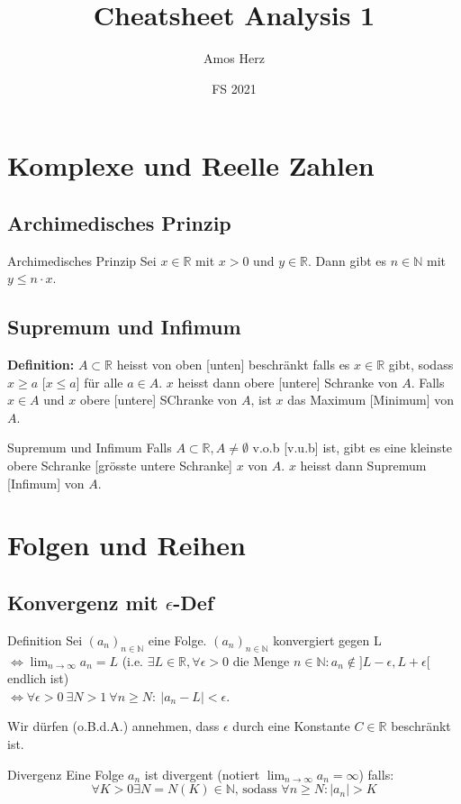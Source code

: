\documentclass[a4paper,8pt]{extarticle}
\title{\vspace{-1cm}Cheatsheet Analysis 1\vspace{-0.65cm}}
\author{Amos Herz\vspace{-0.5cm}}
\date{FS 2021}
\newenvironment{definition}{
   \noindent \textbf{Definition:  }}{}
\def\R{\mathbb{R}}
\def\N{\mathbb{N}}
\begin{document}
\maketitle

\section{Komplexe und Reelle Zahlen}
\subsection{Archimedisches Prinzip}
\begin{mainbox}{Archimedisches Prinzip}
  Sei $x \in \R$ mit $x > 0$ und $y \in \R$. Dann gibt es $n \in \N$ mit $y \leq n \cdot x$.
\end{mainbox}

\subsection{Supremum und Infimum}
\begin{definition}
  $A \subset \R$ heisst von oben [unten] beschränkt falls es $x \in \R$ gibt, sodass $x \geq a$ [$x \leq a$] für alle $a \in A$. $x$ heisst dann obere [untere] Schranke von $A$. Falls $x\in A$ und $x$ obere [untere] SChranke von $A$, ist $x$ das Maximum [Minimum] von $A$.
\end{definition}
\begin{mainbox}{Supremum und Infimum}
  Falls $A \subset \R, A \neq \emptyset$ v.o.b [v.u.b] ist, gibt es eine kleinste obere Schranke [grösste untere Schranke] $x$ von $A$. $x$ heisst dann Supremum [Infimum] von $A$.
\end{mainbox}

\section{Folgen und Reihen}
\subsection{Konvergenz mit $\epsilon$-Def}
\begin{mainbox}{Definition}
  Sei $(a_n)_{n\in \mathbb{N}}$ eine Folge. $(a_n)_{n\in \mathbb{N}}$ konvergiert gegen L \\ $\iff \lim_{n \to \infty} a_n = L $ (i.e. $\exists L \in \R, \forall \epsilon > 0$ die Menge ${n \in \N: a_n \notin ]L - \epsilon, L + \epsilon[}$ endlich ist)\\ $\iff \forall \epsilon > 0 \ \exists N > 1 \ \forall n \ge N : \ | a_n - L | < \epsilon$.
\end{mainbox}
Wir dürfen (o.B.d.A.) annehmen, dass $\epsilon$ durch eine Konstante $C \in \R$ beschränkt ist.
\begin{subbox}{Divergenz}
  Eine Folge $a_n$ ist divergent (notiert $\lim_{n \to \infty} a_n = \infty$) falls: $$\forall K > 0 \exists N = N(K) \in \N \text{, sodass } \forall n \geq N: |a_n| > K$$
\end{subbox}
\end{document}
